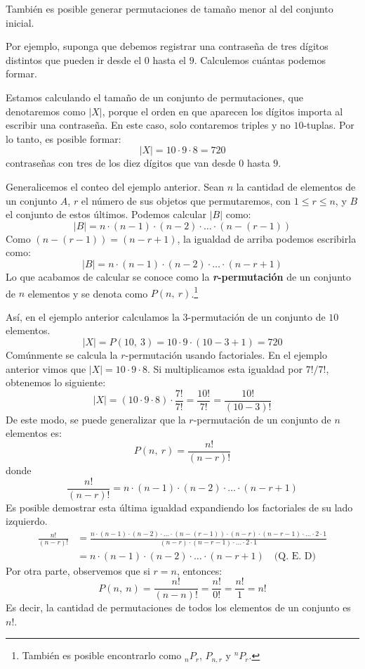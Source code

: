 \documentclass[12pt]{article}
\begin{document}
También es posible generar permutaciones de tamaño menor al del conjunto inicial.

Por ejemplo, suponga que debemos registrar una contraseña de tres dígitos distintos que pueden ir desde el $0$ hasta el $9$. Calculemos cuántas podemos formar.

Estamos calculando el tamaño de un conjunto de permutaciones, que denotaremos como $|X|$, porque el orden en que aparecen los dígitos importa al escribir una contraseña. En este caso, solo contaremos triples y no $10$-tuplas. Por lo tanto, es posible formar:
\[
  |X| = 10 \cdot 9 \cdot 8 = 720
\]
contraseñas con tres de los diez dígitos que van desde $0$ hasta $9$.

Generalicemos el conteo del ejemplo anterior. Sean $n$ la cantidad de elementos de un conjunto $A$, $r$ el número de sus objetos que permutaremos, con $1 \leq r \leq n$, y $B$ el conjunto de estos últimos. Podemos calcular $|B|$ como:
\[
  |B| = n \cdot (n - 1) \cdot (n - 2) \cdot \ldots \cdot (n - (r - 1))
\]
Como $(n - (r - 1)) = (n - r + 1)$, la igualdad de arriba podemos escribirla como:
\[
  |B| = n \cdot (n - 1) \cdot (n - 2) \cdot \ldots \cdot (n - r + 1)
\]
Lo que acabamos de calcular se conoce como la \textbf{\textit{r}-permutación} de un conjunto de $n$ elementos y se denota como $P(n, \ r)$.\footnote{También es posible encontrarlo como ${}_{n}P_{r}$, $P_{n, r}$ y ${}^{n}P_{r}$.}

Así, en el ejemplo anterior calculamos la $3$-permutación de un conjunto de $10$ elementos.
\[
  |X| = P(10, \ 3) = 10 \cdot 9 \cdot (10 - 3 + 1) = 720
\]
Comúnmente se calcula la $r$-permutación usando factoriales. En el ejemplo anterior vimos que $|X| = 10 \cdot 9 \cdot 8$. Si multiplicamos esta igualdad por $7!/7!$, obtenemos lo siguiente:
\[
  |X| = (10 \cdot 9 \cdot 8) \cdot \frac{7!}{7!}
      = \frac{10!}{7!}
      = \frac{10!}{(10 - 3)!}
\]
De este modo, se puede generalizar que la $r$-permutación de un conjunto de $n$ elementos es:
\[
  P(n, \ r) = \frac{n!}{(n - r)!}
\]
donde
\[
  \frac{n!}{(n - r)!} = n \cdot (n - 1) \cdot (n - 2) \cdot \ldots \cdot (n - r + 1)
\]
Es posible demostrar esta última igualdad expandiendo los factoriales de su lado izquierdo.
\begin{align*}
  \frac{n!}{(n - r)!} &= \frac{n \cdot (n - 1) \cdot (n - 2) \cdot \ldots \cdot (n - (r - 1)) \cdot (n - r) \cdot (n - r - 1) \cdot \ldots \cdot 2 \cdot 1}
                             {(n - r) \cdot (n - r - 1) \cdot \ldots \cdot 2 \cdot 1} \\
                      &= n \cdot (n - 1) \cdot (n - 2) \cdot \ldots \cdot (n - r + 1) \quad \text{(Q. E. D)}
\end{align*}
Por otra parte, observemos que si $r = n$, entonces:
\[
  P(n, \ n) = \frac{n!}{(n - n)!} = \frac{n!}{0!} = \frac{n!}{1} = n!
\]
Es decir, la cantidad de permutaciones de todos los elementos de un conjunto es $n!$.
\end{document}

